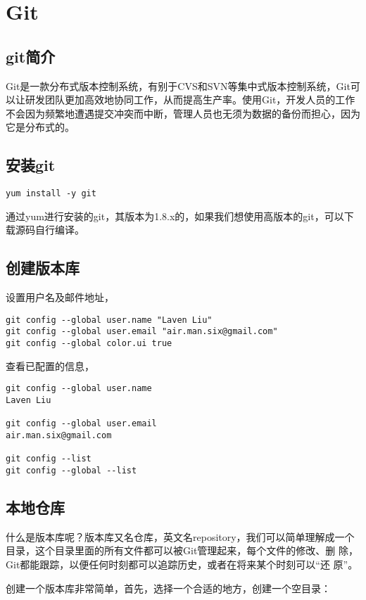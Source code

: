 \chapter{Git}

\section{git简介}

Git是一款分布式版本控制系统，有别于CVS和SVN等集中式版本控制系统，Git可
以让研发团队更加高效地协同工作，从而提高生产率。使用Git，开发人员的工作
不会因为频繁地遭遇提交冲突而中断，管理人员也无须为数据的备份而担心，因为它是分布式的。

\section{安装git}

\begin{verbatim}
yum install -y git
\end{verbatim}

通过yum进行安装的git，其版本为1.8.x的，如果我们想使用高版本的git，可以下载源码自行编译。

\section{创建版本库}
设置用户名及邮件地址，
\begin{verbatim}
git config --global user.name "Laven Liu"
git config --global user.email "air.man.six@gmail.com"
git config --global color.ui true
\end{verbatim}

查看已配置的信息，
\begin{verbatim}
git config --global user.name
Laven Liu

git config --global user.email
air.man.six@gmail.com

git config --list
git config --global --list
\end{verbatim}

\section{本地仓库}

什么是版本库呢？版本库又名仓库，英文名repository，我们可以简单理解成一个
目录，这个目录里面的所有文件都可以被Git管理起来，每个文件的修改、删
除，Git都能跟踪，以便任何时刻都可以追踪历史，或者在将来某个时刻可以“还
原”。

创建一个版本库非常简单，首先，选择一个合适的地方，创建一个空目录：

